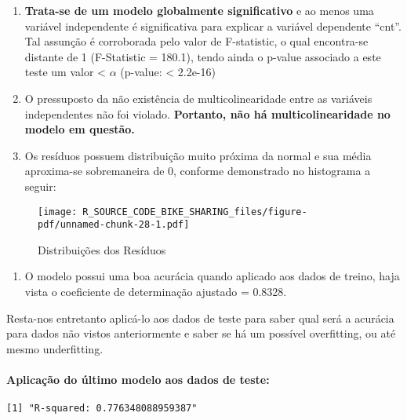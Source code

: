 \documentclass[
  letterpaper,
  DIV=11,
  numbers=noendperiod]{scrartcl}
\let\oldparagraph\paragraph
\renewcommand{\paragraph}[1]{\oldparagraph{#1}\mbox{}}
\providecommand{\tightlist}{%
  \setlength{\itemsep}{0pt}\setlength{\parskip}{0pt}}\usepackage{longtable,booktabs,array}
\begin{document}
\begin{enumerate}
\def\labelenumi{\arabic{enumi})}
\item
  \textbf{Trata-se de um modelo globalmente significativo} e ao menos
  uma variável independente é significativa para explicar a variável
  dependente ``cnt''. Tal assunção é corroborada pelo valor de
  F-statistic, o qual encontra-se distante de 1 (F-Statistic = 180.1),
  tendo ainda o p-value associado a este teste um valor \textless{}
  \(\alpha\) (p-value: \textless{} 2.2e-16)
\item
  O pressuposto da não existência de multicolinearidade entre as
  variáveis independentes não foi violado. \textbf{Portanto, não há
  multicolinearidade no modelo em questão.}
\item
  Os resíduos possuem distribuição muito próxima da normal e sua média
  aproxima-se sobremaneira de 0, conforme demonstrado no histograma a
  seguir:
\end{enumerate}

\begin{figure}[H]

{\centering \texttt{[image: R\_SOURCE\_CODE\_BIKE\_SHARING\_files/figure-pdf/unnamed-chunk-28-1.pdf]}

}

\caption{Distribuições dos Resíduos}

\end{figure}%

\begin{enumerate}
\def\labelenumi{\arabic{enumi})}
\setcounter{enumi}{3}
\tightlist
\item
  O modelo possui uma boa acurácia quando aplicado aos dados de treino,
  haja vista o coeficiente de determinação ajustado = 0.8328.
\end{enumerate}

Resta-nos entretanto aplicá-lo aos dados de teste para saber qual será a
acurácia para dados não vistos anteriormente e saber se há um possível
overfitting, ou até mesmo underfitting.

\paragraph{Aplicação do último modelo aos dados de
teste:}\label{aplicauxe7uxe3o-do-uxfaltimo-modelo-aos-dados-de-teste}

\begin{verbatim}
[1] "R-squared: 0.776348088959387"
\end{verbatim}
\end{document}

